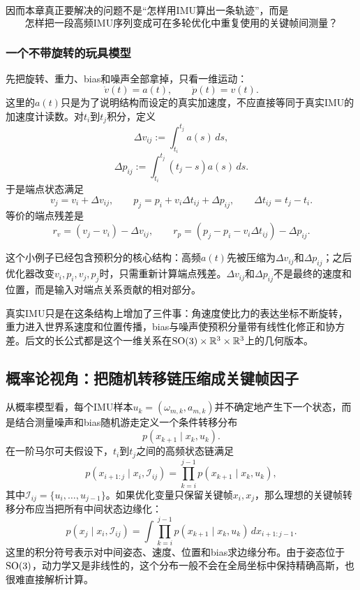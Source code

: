 因而本章真正要解决的问题不是“怎样用IMU算出一条轨迹”，而是
\[
\boxed{
    \text{怎样把一段高频IMU序列变成可在多轮优化中重复使用的关键帧间测量？}
}
\]

\subsubsection{一个不带旋转的玩具模型}

先把旋转、重力、bias和噪声全部拿掉，只看一维运动：
\[
    \dot v(t)=a(t),
    \qquad
    \dot p(t)=v(t).
\]
这里的$a(t)$只是为了说明结构而设定的真实加速度，不应直接等同于真实IMU的加速度计读数。对$t_i$到$t_j$积分，定义
\[
    \Delta v_{ij}:=\int_{t_i}^{t_j}a(s)\,ds,
\]
\[
    \Delta p_{ij}:=\int_{t_i}^{t_j}(t_j-s)a(s)\,ds.
\]
于是端点状态满足
\[
    v_j=v_i+\Delta v_{ij},
    \qquad
    p_j=p_i+v_i\Delta t_{ij}+\Delta p_{ij},
    \qquad
    \Delta t_{ij}=t_j-t_i.
\]
等价的端点残差是
\[
    r_v=(v_j-v_i)-\Delta v_{ij},
    \qquad
    r_p=(p_j-p_i-v_i\Delta t_{ij})-\Delta p_{ij}.
\]

这个小例子已经包含预积分的核心结构：高频$a(t)$先被压缩为$\Delta v_{ij}$和$\Delta p_{ij}$；之后优化器改变$v_i,p_i,v_j,p_j$时，只需重新计算端点残差。$\Delta v_{ij}$和$\Delta p_{ij}$不是最终的速度和位置，而是输入对端点关系贡献的相对部分。

真实IMU只是在这条结构上增加了三件事：角速度使比力的表达坐标不断旋转，重力进入世界系速度和位置传播，bias与噪声使预积分量带有线性化修正和协方差。后文的长公式都是这个一维关系在$\operatorname{SO}(3)\times\mathbb{R}^3\times\mathbb{R}^3$上的几何版本。

\subsection{概率论视角：把随机转移链压缩成关键帧因子}

从概率模型看，每个IMU样本$u_k=(\omega_{m,k},a_{m,k})$并不确定地产生下一个状态，而是结合测量噪声和bias随机游走定义一个条件转移分布
\[
    p(x_{k+1}\mid x_k,u_k).
\]
在一阶马尔可夫假设下，$t_i$到$t_j$之间的高频状态链满足
\[
    p(x_{i+1:j}\mid x_i,\mathcal I_{ij})
    =\prod_{k=i}^{j-1}p(x_{k+1}\mid x_k,u_k),
\]
其中$\mathcal I_{ij}=\{u_i,\ldots,u_{j-1}\}$。如果优化变量只保留关键帧$x_i,x_j$，那么理想的关键帧转移分布应当把所有中间状态边缘化：
\[
\boxed{
    p(x_j\mid x_i,\mathcal I_{ij})
    =\int
      \prod_{k=i}^{j-1}p(x_{k+1}\mid x_k,u_k)
      \,d x_{i+1:j-1}.
}
\]
这里的积分符号表示对中间姿态、速度、位置和bias求边缘分布。由于姿态位于$\operatorname{SO}(3)$，动力学又是非线性的，这个分布一般不会在全局坐标中保持精确高斯，也很难直接解析计算。

